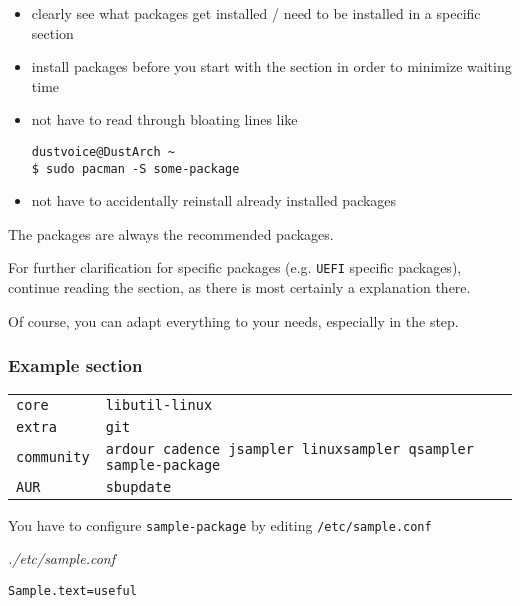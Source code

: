 \documentclass[9pt]{report}
\newenvironment{NOTE}
{\begin{tcolorbox}[colback=admonitionBG,coltitle=draculaFG,colframe=draculaBlue,colbacktitle=draculaBlue,title=NOTE]}
{\end{tcolorbox}}
\newenvironment{packagetable}
{\begin{longtabu}to \textwidth [b]{X[1,r]|X[1,l]}}
{\end{longtabu}}
\newenvironment{mintedlisting}{\captionsetup{format=plain,width=.75\textwidth,type=listing}}{}
\begin{document}
\begin{itemize}

    \item clearly see what packages get installed / need to be installed in a specific section

    \item install packages before you start with the section in order to minimize waiting time

    \item not have to read through bloating lines like

        \begin{verbatim}
dustvoice@DustArch ~
$ sudo pacman -S some-package
        \end{verbatim}
    \item not have to accidentally reinstall already installed packages

\end{itemize}


\begin{NOTE}
    The packages are always the recommended packages.

    For further clarification for specific packages (e.g. \texttt{UEFI} specific packages), continue reading the section, as there is most certainly a explanation there.

    Of course, you can adapt everything to your needs, especially in the \hyperlink{x-additional-setup-packages}{} step.
\end{NOTE}

\newpage

\hypertarget{x-example-section}{\subsubsection{Example section}}
\begin{packagetable}
    \texttt{core} & \texttt{libutil-linux} \\ 
    \texttt{extra} & \texttt{git} \\ 
    \texttt{community} & \texttt{ardour cadence jsampler linuxsampler qsampler sample-package} \\ 
    \texttt{AUR} & \texttt{sbupdate} \\ 
\end{packagetable}

You have to configure \texttt{sample-package} by editing \texttt{/etc/sample.conf}


\begin{mintedlisting}
\caption*{\textit{./etc/sample.conf}}
\begin{verbatim}
Sample.text=useful
\end{verbatim}
\end{mintedlisting}
\end{document}
